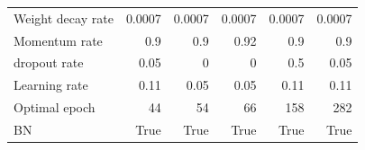 \begin{table}
{\begin{tabular}{@{}lrrrrr@{}}
Weight decay rate         & 0.0007  & 0.0007           & 0.0007           & 0.0007   & 0.0007   \\
Momentum rate             & 0.9     & 0.9              & 0.92             & 0.9     & 0.9     \\
dropout rate              & 0.05    &0              & 0              & 0.5     & 0.05    \\
Learning rate             & 0.11    & 0.05             & 0.05             & 0.11    & 0.11    \\
Optimal epoch & 44      & 54               & 66               & 158     & 282     \\ 
BN & True      & True          & True          & True       & True          \\\bottomrule
\end{tabular}
}
\end{table}
